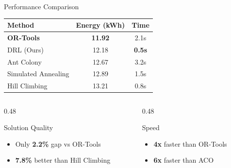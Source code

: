 \documentclass[aspectratio=169,11pt]{beamer}
\begin{document}
\begin{frame}{Performance Comparison}
    \begin{center}
        \begin{tabular}{lcc}
            \toprule
            \textbf{Method} & \textbf{Energy (kWh)} & \textbf{Time} \\
            \midrule
            \textbf{OR-Tools} & \textbf{11.92} & 2.1s \\
            \rowcolor{lightgray} DRL (Ours) & 12.18 & \textbf{0.5s} \\
            Ant Colony & 12.67 & 3.2s \\
            Simulated Annealing & 12.89 & 1.5s \\
            Hill Climbing & 13.21 & 0.8s \\
            \bottomrule
        \end{tabular}
    \end{center}

    \vspace{0.5cm}
    \begin{columns}[T]
        \begin{column}{0.48\textwidth}
            \begin{exampleblock}{Solution Quality}
                \begin{itemize}
                    \item Only \textbf{2.2\%} gap vs OR-Tools
                    \item \textbf{7.8\%} better than Hill Climbing
                \end{itemize}
            \end{exampleblock}
        \end{column}
        \begin{column}{0.48\textwidth}
            \begin{exampleblock}{Speed}
                \begin{itemize}
                    \item \textbf{4x} faster than OR-Tools
                    \item \textbf{6x} faster than ACO
                \end{itemize}
            \end{exampleblock}
        \end{column}
    \end{columns}
\end{frame}
\end{document}
